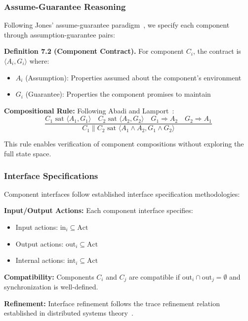 \documentclass[conference]{IEEEtran}
\begin{document}
\subsubsection{Assume-Guarantee Reasoning}

Following Jones' assume-guarantee paradigm~\cite{jones1983tentative}, we specify each component through assumption-guarantee pairs:

\textbf{Definition 7.2 (Component Contract).} For component $C_i$, the contract is $\langle A_i, G_i \rangle$ where:
\begin{itemize}
    \item $A_i$ (Assumption): Properties assumed about the component's environment
    \item $G_i$ (Guarantee): Properties the component promises to maintain
\end{itemize}

\textbf{Compositional Rule:} Following Abadi and Lamport~\cite{abadi2010logic}:
$$\frac{C_1 \text{ sat } \langle A_1, G_1 \rangle \quad C_2 \text{ sat } \langle A_2, G_2 \rangle \quad G_1 \Rightarrow A_2 \quad G_2 \Rightarrow A_1}{C_1 \parallel C_2 \text{ sat } \langle A_1 \wedge A_2, G_1 \wedge G_2 \rangle}$$

This rule enables verification of component compositions without exploring the full state space.

\subsubsection{Interface Specifications}

Component interfaces follow established interface specification methodologies:

\textbf{Input/Output Actions:} Each component interface specifies:
\begin{itemize}
    \item Input actions: $\text{in}_i \subseteq \text{Act}$
    \item Output actions: $\text{out}_i \subseteq \text{Act}$
    \item Internal actions: $\text{int}_i \subseteq \text{Act}$
\end{itemize}

\textbf{Compatibility:} Components $C_i$ and $C_j$ are compatible if $\text{out}_i \cap \text{out}_j = \emptyset$ and synchronization is well-defined.

\textbf{Refinement:} Interface refinement follows the trace refinement relation established in distributed systems theory~\cite{lynch1996distributed}.
\end{document}
